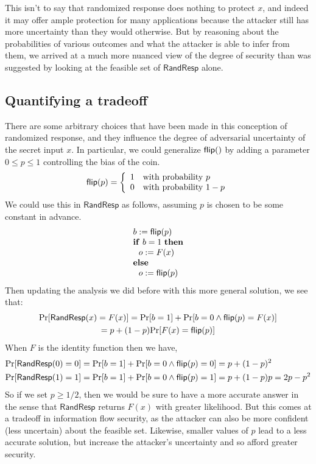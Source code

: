 \documentclass[11pt,twoside]{scrartcl}
\begin{document}
This isn't to say that randomized response does nothing to protect $x$, and indeed it may offer ample protection for many applications because the attacker still has more uncertainty than they would otherwise. But by reasoning about the probabilities of various outcomes and what the attacker is able to infer from them, we arrived at a much more nuanced view of the degree of security than was suggested by looking at the feasible set of $\mathsf{RandResp}$ alone.

\subsection{Quantifying a tradeoff}

There are some arbitrary choices that have been made in this conception of randomized response, and they influence the degree of adversarial uncertainty of the secret input $x$. In particular, we could generalize $\mathsf{flip}()$ by adding a parameter $0 \le p \le 1$ controlling the bias of the coin.
\begin{equation}
\flip(p) = 
\left\{
\begin{array}{ll}
%
1 & \mathrm{with\ probability\ } p \\
0 & \mathrm{with\ probability\ } 1 - p
\end{array}
\right.
\end{equation}
We could use this in $\mathsf{RandResp}$ as follows, assuming $p$ is chosen to be some constant in advance.
\begin{equation}
\begin{array}{l}
%
b := \flip(p) \\
\mathbf{if}\ b = 1\ \mathbf{then} \\
\ \ o := F(x) \\
\mathbf{else} \\
\ \ o := \flip(p)
\end{array}
\end{equation}
Then updating the analysis we did before with this more general solution, we see that:
\begin{multline}
\mathrm{Pr}[\mathsf{RandResp}(x) = F(x)] = \mathrm{Pr}[b = 1] + \mathrm{Pr}[b = 0 \land \mathsf{flip}(p) = F(x)] \\ = p + (1-p)\mathrm{Pr}[F(x)=\mathsf{flip}(p)]
\end{multline}
When $F$ is the identity function then we have,
\begin{align*}
\mathrm{Pr}[\mathsf{RandResp}(0) = 0] = \mathrm{Pr}[b = 1] + \mathrm{Pr}[b = 0 \land \mathsf{flip}(p) = 0] &= p + (1-p)^2 \\
\mathrm{Pr}[\mathsf{RandResp}(1) = 1] = \mathrm{Pr}[b = 1] + \mathrm{Pr}[b = 0 \land \mathsf{flip}(p) = 1] &= p + (1-p)p = 2p - p^2
\end{align*}
So if we set $p \ge 1/2$, then we would be sure to have a more accurate answer in the sense that $\mathsf{RandResp}$ returns $F(x)$ with greater likelihood. But this comes at a tradeoff in information flow security, as the attacker can also be more confident (less uncertain) about the feasible set. Likewise, smaller values of $p$ lead to a less accurate solution, but increase the attacker's uncertainty and so afford greater security.
\end{document}
